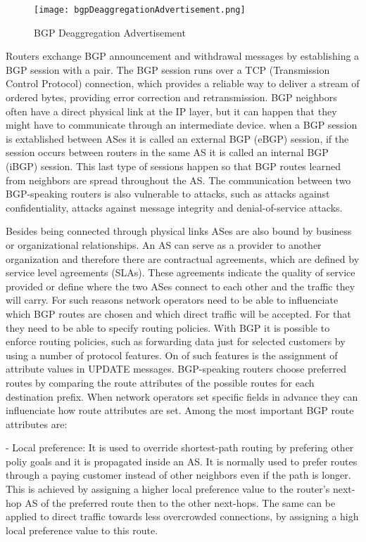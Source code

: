\documentclass[11pt,a4paper]{scrreprt}
\begin{document}
\begin{figure}[h!]
\centering
\texttt{[image: bgpDeaggregationAdvertisement.png]}
\caption{BGP Deaggregation Advertisement}
\label{fig:bgpDeaggregationAdvertisement}
\end{figure}


Routers exchange BGP announcement and withdrawal messages by establishing a BGP session with a pair. The BGP session runs over a TCP (Transmission Control Protocol) connection, which provides a reliable way to deliver a stream of ordered bytes, providing error correction and retransmission. BGP neighbors often have a direct physical link at the IP layer, but it can happen that they might have to communicate through an intermediate device. when a BGP session is extablished between ASes it is called an external BGP (eBGP) session, if the session occurs between routers in the same AS it is called an internal BGP (iBGP) session. This last type of sessions happen so that BGP routes learned from neighbors are spread throughout the AS. The communication between two BGP-speaking routers is also vulnerable to attacks, such as attacks against confidentiality, attacks against message integrity and denial-of-service attacks.

Besides being connected through physical links ASes are also bound by business or organizational relationships. An AS can serve as a provider to another organization and therefore there are contractual agreements, which are defined by service level agreements (SLAs). These agreements indicate the quality of service provided or define where the two ASes connect to each other and the traffic they will carry. For such reasons network operators need to be able to influenciate which BGP routes are chosen and which direct traffic will be accepted. For that they need to be able to specify routing policies. With BGP it is possible to enforce routing policies, such as forwarding data just for selected customers by using a number of protocol features. On of such features is the assignment of attribute values in UPDATE messages. BGP-speaking routers choose preferred routes by comparing the route attributes of the possible routes for each destination prefix. When network operators set specific fields in advance they can influenciate how route attributes are set. Among the most important BGP route attributes are:

- Local preference: It is used to override shortest-path routing by prefering other poliy goals and it is propagated inside an AS. It is normally used to prefer routes through a paying customer instead of other neighbors even if the path is longer. This is achieved by assigning a higher local preference value to the router's next-hop AS of the preferred route then to the other next-hops. The same can be applied to direct traffic towards less overcrowded connections, by assigning a high local preference value to this route. 
\end{document}
